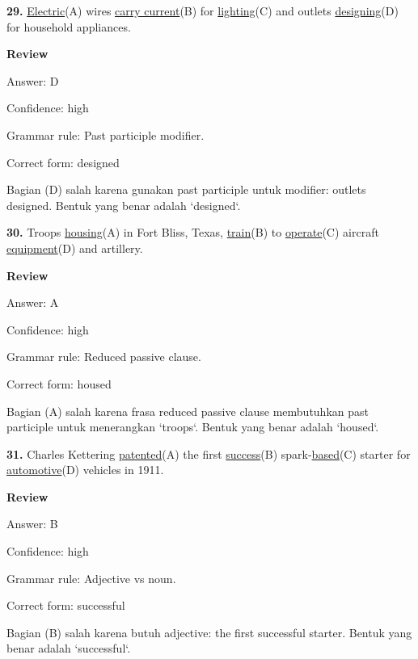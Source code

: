 \documentclass[12pt]{article}
\begin{document}
\noindent\textbf{29.} \uline{Electric}(A) wires \uline{carry current}(B) for \uline{lighting}(C) and outlets \uline{designing}(D) for household appliances.
\par
\begingroup
\setlength{\parskip}{0pt}
\setlength{\parindent}{0pt}
\textbf{Review}\par
Answer: D\par
Confidence: high\par
Grammar rule: Past participle modifier.\par
Correct form: designed\par
Bagian (D) salah karena gunakan past participle untuk modifier: outlets designed. Bentuk yang benar adalah `designed`.\par
\endgroup
\par
\vspace{\questionblockgap}
\noindent\textbf{30.} Troops \uline{housing}(A) in Fort Bliss, Texas, \uline{train}(B) to \uline{operate}(C) aircraft \uline{equipment}(D) and artillery.
\par
\begingroup
\setlength{\parskip}{0pt}
\setlength{\parindent}{0pt}
\textbf{Review}\par
Answer: A\par
Confidence: high\par
Grammar rule: Reduced passive clause.\par
Correct form: housed\par
Bagian (A) salah karena frasa reduced passive clause membutuhkan past participle untuk menerangkan `troops`. Bentuk yang benar adalah `housed`.\par
\endgroup
\par
\vspace{\questionblockgap}
\noindent\textbf{31.} Charles Kettering \uline{patented}(A) the first \uline{success}(B) spark-\uline{based}(C) starter for \uline{automotive}(D) vehicles in 1911.
\par
\begingroup
\setlength{\parskip}{0pt}
\setlength{\parindent}{0pt}
\textbf{Review}\par
Answer: B\par
Confidence: high\par
Grammar rule: Adjective vs noun.\par
Correct form: successful\par
Bagian (B) salah karena butuh adjective: the first successful starter. Bentuk yang benar adalah `successful`.\par
\endgroup
\par
\vspace{\questionblockgap}
\end{document}
